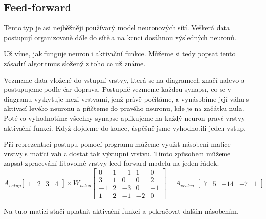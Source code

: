 \documentclass[12pt,a4paper]{report}
\begin{document}
		\subsection{Feed-forward}
		Tento typ je asi nejběžněji používaný model neuronových sítí. Veškerá data postupují organizovaně dále do sítě a na konci dosáhnou výsledných neuronů.
		
		Už víme, jak funguje neuron i aktivační funkce. Můžeme si tedy popsat tento zásadní algoritmus složený z toho co už známe.
		
		Vezmeme data vložené do vstupní vrstvy, která se na diagramech značí nalevo a postupujeme podle čar doprava. Postupně vezmeme každou synapsi, co se v diagramu vyskytuje mezi vrstvami, jenž právě počítáme, a vynásobíme její váhu s aktivací levého neuronu a přičteme do pravého neuronu, kde je na začátku nula. Poté co vyhodnotíme všechny synapse aplikujeme na každý neuron pravé vrstvy aktivační funkci. Když dojdeme do konce, úspěšně jsme vyhodnotili jeden vstup.
		
		Při reprezentaci postupu pomocí programu můžeme využít násobení matice vrstvy s maticí vah a dostat tak výstupní vrstvu. Tímto způsobem můžeme zapsat zpracování libovolné vrstvy feed-forward modelu na jeden řádek.
		$$
		A_{vstup}
		\begin{bmatrix}
		1 & 2 & 3 & 4
		\end{bmatrix}
		\times
		W_{vstup}
		\begin{bmatrix}
		0  & 1 & -1 & 1  & 0  \\
		3  & 1 & 0  & 0  & 2  \\
		-1 & 2 & -3 & 0  & -1 \\
		1  & 2 & -1 & -2 & 0 
		\end{bmatrix}
		=
		A_{vrstva_1}
		\begin{bmatrix}
		7 & 5 & -14 & -7 & 1
		\end{bmatrix}
		$$
		
		Na tuto matici stačí uplatnit aktivační funkci a pokračovat dalším násobením.
		
\end{document}
